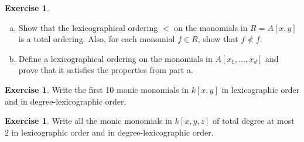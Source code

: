 \documentclass{amsart}
\theoremstyle{plain}
\theoremstyle{definition}
\newtheorem{exercise}[theorem]{Exercise}
\theoremstyle{definition}
\begin{document}
\begin{exercise} %
\begin{enumerate}[a.]
\item
Show that the lexicographical ordering $<$ on the monomials in $R=A[x,y]$ is a total ordering.
Also, for each monomial $f\in R$, show that $f\not< f$.
\item
Define a lexicographical ordering on the monomials in $A[x_1,\ldots,x_d]$ and prove that
it satisfies the properties from part a.
\end{enumerate}
\end{exercise}

\begin{exercise} %
Write the first 10 monic monomials in $k[x,y]$ in lexicographic order and in degree-lexicographic order.
\end{exercise}

\begin{exercise} %
Write all the monic monomials in $k[x,y,z]$ of total degree at most $2$
in lexicographic order and in degree-lexicographic order.
\end{exercise}
\end{document}
